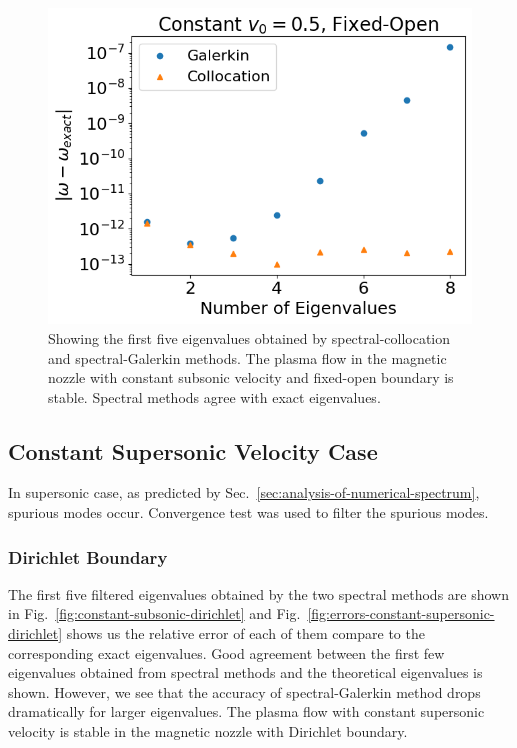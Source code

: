 \begin{figure}[htbp]
	\centering
	\includegraphics[width=0.7\linewidth]{figures/errors-constant-subsonic-fixed-open.png}
	\caption{Showing the first five eigenvalues obtained by spectral-collocation and spectral-Galerkin methods. The plasma flow in the magnetic nozzle with constant subsonic velocity and fixed-open boundary is stable. Spectral methods agree with exact eigenvalues.}
	\label{fig:errors-constant-subsonic-fixed-open}
\end{figure}

\subsection{Constant Supersonic Velocity Case}
In supersonic case, as predicted by Sec.~\ref{sec:analysis-of-numerical-spectrum}, spurious modes occur. Convergence test was used to filter the spurious modes.

\subsubsection*{Dirichlet Boundary}
The first five filtered eigenvalues obtained by the two spectral methods are shown in Fig.~\ref{fig:constant-subsonic-dirichlet} and Fig.~\ref{fig:errors-constant-supersonic-dirichlet} shows us the relative error of each of them compare to the corresponding exact eigenvalues. Good agreement between the first few eigenvalues obtained from spectral methods and the theoretical eigenvalues is shown. However, we see that the accuracy of spectral-Galerkin method drops dramatically for larger eigenvalues. The plasma flow with constant supersonic velocity is stable in the magnetic nozzle with Dirichlet boundary.

